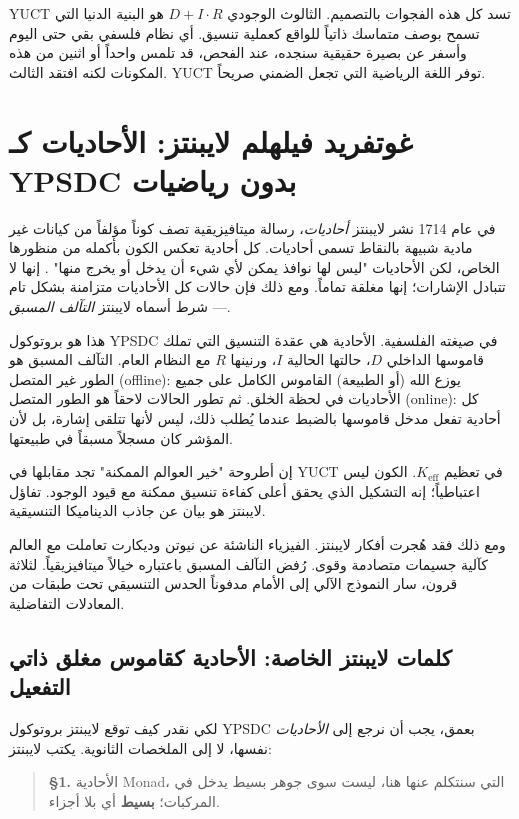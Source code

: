 \documentclass[12pt,a4paper]{article}
\begin{document}
	YUCT تسد كل هذه الفجوات بالتصميم. الثالوث الوجودي \(D + I \cdot R\) هو البنية الدنيا التي تسمح بوصف متماسك ذاتياً للواقع كعملية تنسيق. أي نظام فلسفي بقي حتى اليوم وأسفر عن بصيرة حقيقية سنجده، عند الفحص، قد تلمس واحداً أو اثنين من هذه المكونات لكنه افتقد الثالث. YUCT توفر اللغة الرياضية التي تجعل الضمني صريحاً.
	
	\section{غوتفريد فيلهلم لايبنتز: الأحاديات كـ YPSDC بدون رياضيات}
	
	في عام 1714 نشر لايبنتز \emph{أحاديات}، رسالة ميتافيزيقية تصف كوناً مؤلفاً من كيانات غير مادية شبيهة بالنقاط تسمى أحاديات. كل أحادية تعكس الكون بأكمله من منظورها الخاص، لكن الأحاديات "ليس لها نوافذ يمكن لأي شيء أن يدخل أو يخرج منها" \cite{Leibniz1714}. إنها لا تتبادل الإشارات؛ إنها مغلقة تماماً. ومع ذلك فإن حالات كل الأحاديات متزامنة بشكل تام — شرط أسماه لايبنتز \emph{التآلف المسبق}.
	
	هذا هو بروتوكول YPSDC في صيغته الفلسفية. الأحادية هي عقدة التنسيق التي تملك قاموسها الداخلي \(D\)، حالتها الحالية \(I\)، ورنينها \(R\) مع النظام العام. التآلف المسبق هو الطور غير المتصل (offline): يوزع الله (أو الطبيعة) القاموس الكامل على جميع الأحاديات في لحظة الخلق. ثم تطور الحالات لاحقاً هو الطور المتصل (online): كل أحادية تفعل مدخل قاموسها بالضبط عندما يُطلب ذلك، ليس لأنها تتلقى إشارة، بل لأن المؤشر كان مسجلاً مسبقاً في طبيعتها.
	
	إن أطروحة "خير العوالم الممكنة" تجد مقابلها في YUCT في تعظيم \(K_{\mathrm{eff}}\). الكون ليس اعتباطياً؛ إنه التشكيل الذي يحقق أعلى كفاءة تنسيق ممكنة مع قيود الوجود. تفاؤل لايبنتز هو بيان عن جاذب الديناميكا التنسيقية.
	
	ومع ذلك فقد هُجرت أفكار لايبنتز. الفيزياء الناشئة عن نيوتن وديكارت تعاملت مع العالم كآلية جسيمات متصادمة وقوى. رُفض التآلف المسبق باعتباره خيالاً ميتافيزيقياً. لثلاثة قرون، سار النموذج الآلي إلى الأمام مدفوناً الحدس التنسيقي تحت طبقات من المعادلات التفاضلية.
	
	\subsection{كلمات لايبنتز الخاصة: الأحادية كقاموس مغلق ذاتي التفعيل}
	
	لكي نقدر كيف توقع لايبنتز بروتوكول YPSDC بعمق، يجب أن نرجع إلى \emph{الأحاديات} نفسها، لا إلى الملخصات الثانوية. يكتب لايبنتز:
	
	\begin{quote}
		\textbf{§1.} الأحادية Monad، التي سنتكلم عنها هنا، ليست سوى جوهر بسيط يدخل في المركبات؛ \textbf{بسيط} أي بلا أجزاء.
	\end{quote}
	
\end{document}
